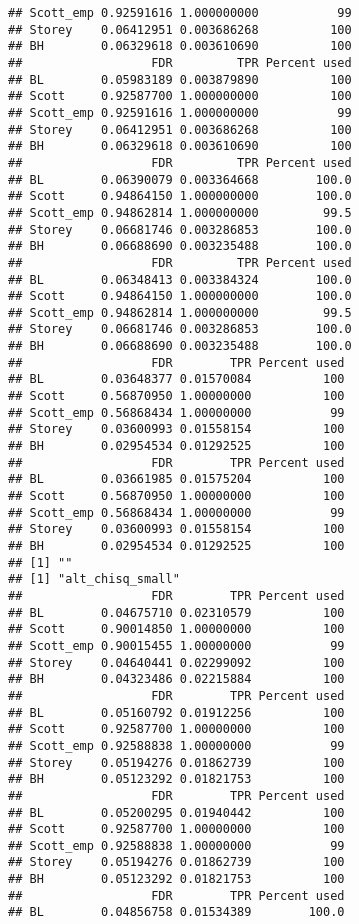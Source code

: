\documentclass{article}\usepackage[]{graphicx}\usepackage[]{color}
\makeatletter
\newenvironment{kframe}{%
 \def\at@end@of@kframe{}%
 \ifinner\ifhmode%
  \def\at@end@of@kframe{\end{minipage}}%
  \begin{minipage}{\columnwidth}%
 \fi\fi%
 \def\FrameCommand##1{\hskip\@totalleftmargin \hskip-\fboxsep
 \colorbox{shadecolor}{##1}\hskip-\fboxsep
     \hskip-\linewidth \hskip-\@totalleftmargin \hskip\columnwidth}%
 \MakeFramed {\advance\hsize-\width
   \@totalleftmargin\z@ \linewidth\hsize
   \@setminipage}}%
 {\par\unskip\endMakeFramed%
 \at@end@of@kframe}
\newenvironment{knitrout}{}{} %
\makeatother
\begin{document}
\begin{knitrout}
\begin{kframe}
\begin{verbatim}
## Scott_emp 0.92591616 1.000000000           99
## Storey    0.06412951 0.003686268          100
## BH        0.06329618 0.003610690          100
##                  FDR         TPR Percent used
## BL        0.05983189 0.003879890          100
## Scott     0.92587700 1.000000000          100
## Scott_emp 0.92591616 1.000000000           99
## Storey    0.06412951 0.003686268          100
## BH        0.06329618 0.003610690          100
##                  FDR         TPR Percent used
## BL        0.06390079 0.003364668        100.0
## Scott     0.94864150 1.000000000        100.0
## Scott_emp 0.94862814 1.000000000         99.5
## Storey    0.06681746 0.003286853        100.0
## BH        0.06688690 0.003235488        100.0
##                  FDR         TPR Percent used
## BL        0.06348413 0.003384324        100.0
## Scott     0.94864150 1.000000000        100.0
## Scott_emp 0.94862814 1.000000000         99.5
## Storey    0.06681746 0.003286853        100.0
## BH        0.06688690 0.003235488        100.0
##                  FDR        TPR Percent used
## BL        0.03648377 0.01570084          100
## Scott     0.56870950 1.00000000          100
## Scott_emp 0.56868434 1.00000000           99
## Storey    0.03600993 0.01558154          100
## BH        0.02954534 0.01292525          100
##                  FDR        TPR Percent used
## BL        0.03661985 0.01575204          100
## Scott     0.56870950 1.00000000          100
## Scott_emp 0.56868434 1.00000000           99
## Storey    0.03600993 0.01558154          100
## BH        0.02954534 0.01292525          100
## [1] ""
## [1] "alt_chisq_small"
##                  FDR        TPR Percent used
## BL        0.04675710 0.02310579          100
## Scott     0.90014850 1.00000000          100
## Scott_emp 0.90015455 1.00000000           99
## Storey    0.04640441 0.02299092          100
## BH        0.04323486 0.02215884          100
##                  FDR        TPR Percent used
## BL        0.05160792 0.01912256          100
## Scott     0.92587700 1.00000000          100
## Scott_emp 0.92588838 1.00000000           99
## Storey    0.05194276 0.01862739          100
## BH        0.05123292 0.01821753          100
##                  FDR        TPR Percent used
## BL        0.05200295 0.01940442          100
## Scott     0.92587700 1.00000000          100
## Scott_emp 0.92588838 1.00000000           99
## Storey    0.05194276 0.01862739          100
## BH        0.05123292 0.01821753          100
##                  FDR        TPR Percent used
## BL        0.04856758 0.01534389        100.0

\end{verbatim}
\end{kframe}
\end{knitrout}
\end{document}
